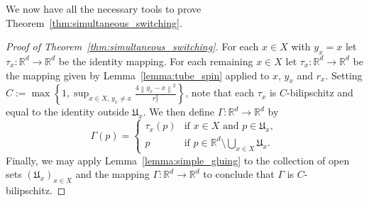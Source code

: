 \documentclass[a4paper, bibliography=totoc]{scrartcl}
\numberwithin{claimcounter}{define}
\newcommand{\R}{\mathbb{R}}
\newcommand{\enorm}[1]{\left\|#1\right\|}
\newcommand{\mf}[1]{\mathfrak{#1}}
\newcommand{\set}[1]{\left\{#1\right\}}
\begin{document}
We now have all the necessary tools to prove Theorem~\ref{thm:simultaneous_switching}.
\begin{proof}[Proof of Theorem~\ref{thm:simultaneous_switching}]
	For each $x\in X$ with $y_{x}=x$ let $\tau_{x}\colon \R^{d}\to\R^{d}$ be the identity mapping. For each remaining $x\in X$ let $\tau_{x}\colon\R^{d}\to \R^{d}$ be the mapping given by Lemma~\ref{lemma:tube_spin} applied to $x$, $y_{x}$ and $r_{x}$. Setting $C:=\displaystyle\max\set{1, \sup_{x\in X,\, y_{x}\neq x}\frac{4\enorm{y_{x}-x}^{2}}{r_{x}^{2}}}$, note that each $\tau_x$ is $C$-bilipschitz and equal to the identity outside $\mf{U}_x$.  We then define $\Gamma\colon \R^{d}\to \R^{d}$ by 
	\begin{equation*}
	\Gamma(p)=\begin{cases}
	\tau_{x}(p) & \text{if $x\in X$ and $p\in \mf{U}_{x}$},\\
	p & \text{if }p\in \R^{d}\setminus \bigcup_{x\in X}\mf{U}_{x}.
	\end{cases}
	\end{equation*}
	Finally, we may apply Lemma~\ref{lemma:simple_gluing} to the collection of open sets $(\mf{U}_{x})_{x\in X}$ and the mapping $\Gamma\colon \R^{d}\to \R^{d}$ to conclude that $\Gamma$ is $C$-bilipschitz.
\end{proof}
\end{document}
